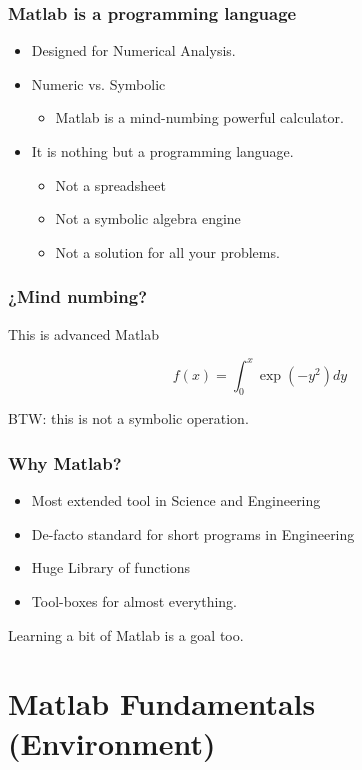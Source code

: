 \documentclass[12pt]{beamer}
\begin{document}
\begin{frame}
  \frametitle{Matlab is a programming language}
  \begin{itemize}
  \item Designed for Numerical Analysis.
  \item Numeric vs. Symbolic
    \begin{itemize}
    \item Matlab is a mind-numbing powerful calculator.
    \end{itemize}
  \item It is nothing but a programming language.
    \begin{itemize}
    \item Not a spreadsheet
    \item Not a symbolic algebra engine
    \item Not a solution for all your problems.
    \end{itemize}
  \end{itemize}
\end{frame}

\begin{frame}
  \frametitle{¿Mind numbing?}
This is advanced Matlab

\[ f(x) = \int_0^x \exp(-y^2) dy \]

\testcode

BTW: this is not a symbolic operation.
\end{frame}

\begin{frame}
  \frametitle{Why Matlab?}

  \begin{itemize}
  \item Most extended tool in Science and Engineering
  \item De-facto standard for short programs in Engineering
  \item Huge Library of functions
  \item Tool-boxes for almost everything.
  \end{itemize}

  Learning a bit of Matlab is a goal too.
\end{frame}

\section{Matlab Fundamentals (Environment)}
\end{document}
